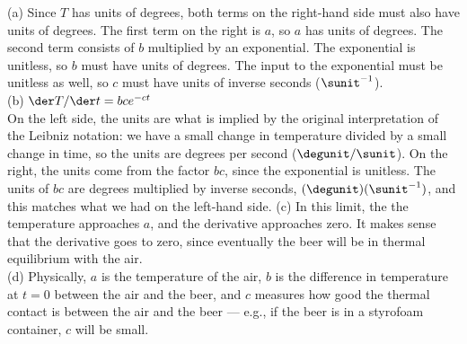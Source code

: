 (a) Since $T$ has units of degrees, both terms on the right-hand side must also have
units of degrees. The first term on the right is $a$, so $a$ has units of degrees.
The second term consists of $b$ multiplied by an exponential. The exponential is
unitless, so $b$ must have units of degrees. The input to the exponential must be
unitless as well, so $c$ must have units of inverse seconds ($\sunit^{-1}$).\\
(b) $\der T/\der t=bce^{-ct}$\\
On the left side, the units are what is implied by the original interpretation of
the Leibniz notation: we have a small change in temperature divided by a small change
in time, so the units are degrees per second ($\degunit/\sunit$). On the right, the
units come from the factor $bc$, since the exponential is unitless. The units of
$bc$ are degrees multiplied by inverse seconds, $(\degunit)(\sunit^{-1})$, and this
matches what we had on the left-hand side.
(c) In this limit, the the temperature approaches $a$, and the derivative approaches zero.
It makes sense that the derivative goes to zero, since eventually the beer will be
in thermal equilibrium with the air.\\
(d) Physically, $a$ is the temperature of the air, $b$ is the difference in
temperature at $t=0$ between the air and the beer, and $c$ measures how good
the thermal contact is between the air and the beer --- e.g., if the beer is in
a styrofoam container, $c$ will be small.
